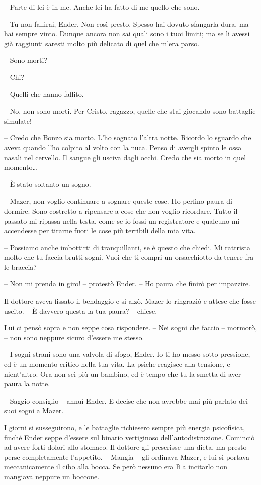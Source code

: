 {-- Parte di lei è in me. Anche lei ha fatto di me quello che sono.}

{-- Tu non fallirai, Ender. Non così presto. Spesso hai dovuto sfangarla
	dura, ma hai sempre vinto. Dunque ancora non sai quali sono i tuoi
	limiti; ma se li avessi già raggiunti saresti molto più delicato di quel
	che m'era parso.}

{-- Sono morti?}

{-- Chi?}

{-- Quelli che hanno fallito.}

{-- No, non sono morti. Per Cristo, ragazzo, quelle che stai giocando
	sono battaglie simulate!}

{-- Credo che Bonzo sia morto. L'ho sognato l'altra notte. Ricordo lo
	sguardo che aveva quando l'ho colpito al volto con la nuca. Penso di
	avergli spinto le ossa nasali nel cervello. Il sangue gli usciva dagli
	occhi. Credo che sia morto in quel momento\ldots{}}

{-- È stato soltanto un sogno.}

{-- Mazer, non voglio continuare a sognare queste cose. Ho perfino paura
	di dormire. Sono costretto a ripensare a cose che non voglio ricordare.
	Tutto il passato mi ripassa nella testa, come se io fossi un
	registratore e qualcuno mi accendesse per tirarne fuori le cose più
	terribili della mia vita.}

{-- Possiamo anche imbottirti di tranquillanti, se è questo che chiedi.
	Mi rattrista molto che tu faccia brutti sogni. Vuoi che ti compri un
	orsacchiotto da tenere fra le braccia?}

{-- Non mi prenda in giro! -- protestò Ender. -- Ho paura che finirò per
	impazzire.}

{Il dottore aveva fissato il bendaggio e si alzò. Mazer lo ringraziò e
	attese che fosse uscito. -- È davvero questa la tua paura? -- chiese.}

{Lui ci pensò sopra e non seppe cosa rispondere. -- Nei sogni che faccio
	-- mormorò, -- non sono neppure sicuro d'essere me stesso.}

{-- I sogni strani sono una valvola di sfogo, Ender. Io ti ho messo
	sotto pressione, ed è un momento critico nella tua vita. La psiche
	reagisce alla tensione, e nient'altro. Ora non sei più un bambino, ed è
	tempo che tu la smetta di aver paura la notte.}

{-- Saggio consiglio -- annuì Ender. E decise che non avrebbe mai più
	parlato dei suoi sogni a Mazer.}

{I giorni si susseguirono, e le battaglie richiesero sempre più energia
	psicofisica, finché Ender seppe d'essere sul binario vertiginoso
	dell'autodistruzione. Cominciò ad avere forti dolori allo stomaco. Il
	dottore gli prescrisse una dieta, ma presto perse completamente
	l'appetito. -- Mangia -- gli ordinava Mazer, e lui si portava
	meccanicamente il cibo alla bocca. Se però nessuno era lì a incitarlo
	non mangiava neppure un boccone.}

